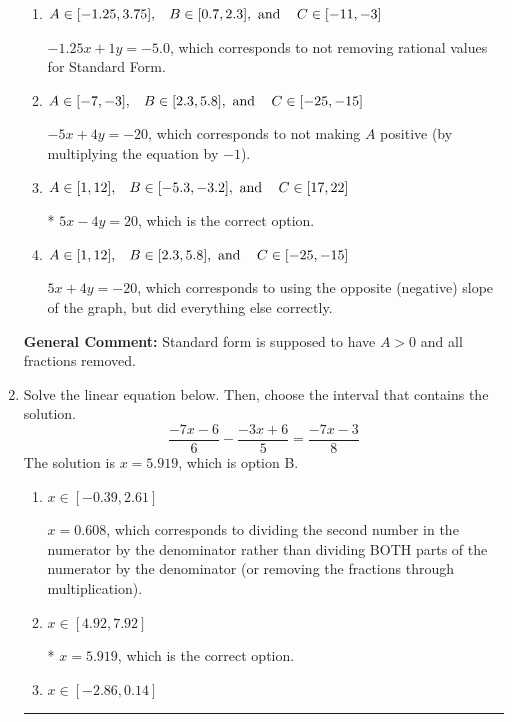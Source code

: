 \documentclass{extbook}[14pt]
\newcommand{\litem}[1]{\item #1

\rule{\textwidth}{0.4pt}}
\begin{document}
\begin{enumerate}
{\begin{enumerate}[label=\Alph*.]
 $-1.25x - 1y = 5.0$, which corresponds to using the opposite (negative) slope of the graph and not removing rational values.
\item \( A \in [-1.25, 3.75], \hspace{3mm} B \in [0.7, 2.3], \text{ and } \hspace{3mm} C \in [-11, -3] \)

 $-1.25x + 1y = -5.0$, which corresponds to not removing rational values for Standard Form.
\item \( A \in [-7, -3], \hspace{3mm} B \in [2.3, 5.8], \text{ and } \hspace{3mm} C \in [-25, -15] \)

 $-5x + 4y = -20$, which corresponds to not making $A$ positive (by multiplying the equation by $-1$).
\item \( A \in [1, 12], \hspace{3mm} B \in [-5.3, -3.2], \text{ and } \hspace{3mm} C \in [17, 22] \)

* $5x - 4y = 20$, which is the correct option.
\item \( A \in [1, 12], \hspace{3mm} B \in [2.3, 5.8], \text{ and } \hspace{3mm} C \in [-25, -15] \)

 $5x + 4y = -20$, which corresponds to using the opposite (negative) slope of the graph, but did everything else correctly.
\end{enumerate}

\textbf{General Comment:} Standard form is supposed to have $A > 0$ and all fractions removed.
}
\litem{
Solve the linear equation below. Then, choose the interval that contains the solution.
\[ \frac{-7x -6}{6} - \frac{-3x + 6}{5} = \frac{-7x -3}{8} \]
The solution is \( x = 5.919 \), which is option B.\begin{enumerate}[label=\Alph*.]
\item \( x \in [-0.39, 2.61] \)

 $x = 0.608$, which corresponds to dividing the second number in the numerator by the denominator rather than dividing BOTH parts of the numerator by the denominator (or removing the fractions through multiplication).
\item \( x \in [4.92, 7.92] \)

* $x = 5.919$, which is the correct option.
\item \( x \in [-2.86, 0.14] \)


\end{enumerate}}
\end{enumerate}
\end{document}
